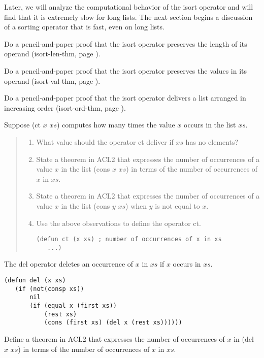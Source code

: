 Later, we will analyze the computational behavior of the isort operator
and will find that it is extremely slow for long lists.
The next section begins a discussion of a sorting operator
that is fast, even on long lists.

\begin{ExerciseList}
\Exercise
Do a pencil-and-paper proof that the isort operator
preserves the length of its operand
(isort-len-thm, page \pageref{defthm:isort-len}).

\Exercise
Do a pencil-and-paper proof that the isort operator
preserves the values in its operand
(isort-val-thm, page \pageref{defthm:isort-val}).

\Exercise
Do a pencil-and-paper proof that the isort operator
delivers a list arranged in increasing order
(isort-ord-thm, page \pageref{defthm:isort-ord-thm}).

\Exercise
Suppose (ct $x$ $xs$) computes how many times
the value $x$ occurs in the list $xs$.
\begin{quote}
\begin{enumerate}[label=\alph*{. }]
\item What value should the operator ct deliver if $xs$ has no elements?
\item State a theorem in ACL2 that expresses the
      number of occurrences of a value $x$ in the list (cons $x$ $xs$)
      in terms of the number of occurrences of $x$ in $xs$.
\item State a theorem in ACL2 that expresses the
      number of occurrences of a value $x$ in the list (cons $y$ $xs$)
      when $y$ is not equal to $x$.
\item Use the above observations to define the operator ct.
\begin{verbatim}
(defun ct (x xs) ; number of occurrences of x in xs
   ...)
\end{verbatim}
\end{enumerate}
\end{quote}

\Exercise
The 
del operator
deletes an occurrence of $x$ in $xs$
if $x$ occurs in $xs$.
\label{defun:del}
\begin{Verbatim}
(defun del (x xs)
   (if (not(consp xs))
       nil
       (if (equal x (first xs))
           (rest xs)
           (cons (first xs) (del x (rest xs))))))
\end{Verbatim}
Define a theorem in ACL2 that
expresses the number of occurrences of $x$ in (del $x$ $xs$)
in terms of the number of occurrences of $x$ in $xs$.


\end{ExerciseList}
